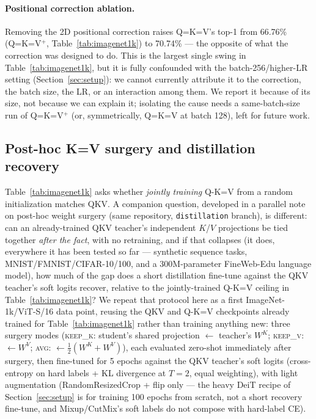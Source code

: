 \documentclass[11pt]{article}
\begin{document}
\paragraph{Positional correction ablation.} Removing the 2D positional
correction raises Q=K=V's top-1 from 66.76\% (Q=K=V\(^+\), Table~\ref{tab:imagenet1k})
to 70.74\% --- the opposite of what the correction was designed to do. This
is the largest single swing in Table~\ref{tab:imagenet1k}, but it is fully confounded with
the batch-256/higher-LR setting (Section~\ref{sec:setup}): we cannot
currently attribute it to the correction, the batch size, the LR, or an
interaction among them. We report it because of its size, not because we
can explain it; isolating the cause needs a same-batch-size run of Q=K=V\(^+\)
(or, symmetrically, Q=K=V at batch 128), left for future work.

\subsection{Post-hoc K=V surgery and distillation recovery}
\label{sec:surgery}
Table~\ref{tab:imagenet1k} asks whether \emph{jointly training} Q-K=V from a
random initialization matches QKV. A companion question, developed in a
parallel note on post-hoc weight surgery (same repository, \texttt{distillation}
branch), is different: can an already-trained QKV teacher's independent
$K$/$V$ projections be tied together \emph{after the fact}, with no
retraining, and if that collapses (it does, everywhere it has been tested so
far --- synthetic sequence tasks, MNIST/FMNIST/CIFAR-10/100, and a
300M-parameter FineWeb-Edu language model), how much of the gap does a short
distillation fine-tune against the QKV teacher's soft logits recover,
relative to the jointly-trained Q-K=V ceiling in Table~\ref{tab:imagenet1k}?
We repeat that protocol here as a first ImageNet-1k/ViT-S/16 data point,
reusing the QKV and Q-K=V checkpoints already trained for
Table~\ref{tab:imagenet1k} rather than training anything new: three surgery
modes (\textsc{keep\_k}: student's shared projection $\leftarrow$ teacher's
$W^K$; \textsc{keep\_v}: $\leftarrow W^V$; \textsc{avg}: $\leftarrow
\tfrac12(W^K+W^V)$), each evaluated zero-shot immediately after surgery, then
fine-tuned for 5 epochs against the QKV teacher's soft logits (cross-entropy
on hard labels + KL divergence at $T{=}2$, equal weighting), with light
augmentation (RandomResizedCrop + flip only --- the heavy DeiT recipe of
Section~\ref{sec:setup} is for training 100 epochs from scratch, not a short
recovery fine-tune, and Mixup/CutMix's soft labels do not compose with
hard-label CE).
\end{document}
